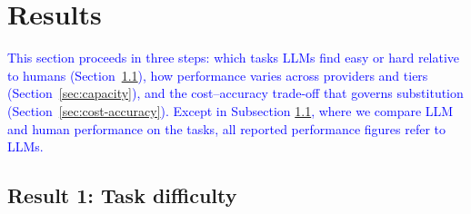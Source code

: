 \documentclass[12pt,a4paper]{article}
\newcommand{\blue}[1]{\textcolor{blue}{#1}}
\newcommand{\SC}[1]{\textcolor{violet}{SC: #1}}
\begin{document}




\section{Results}

\blue{This section proceeds in three steps: which tasks LLMs find easy or hard relative to humans (Section~\ref{subsec:difficulty}), how performance varies across providers and tiers (Section~\ref{sec:capacity}), and the cost–accuracy trade-off that governs substitution (Section~\ref{sec:cost-accuracy}). Except in Subsection \ref{subsec:difficulty}, where we compare LLM and human performance on the tasks, all reported performance figures refer to LLMs.}

\subsection{Result 1: Task difficulty}
\label{subsec:difficulty}

\end{document}
